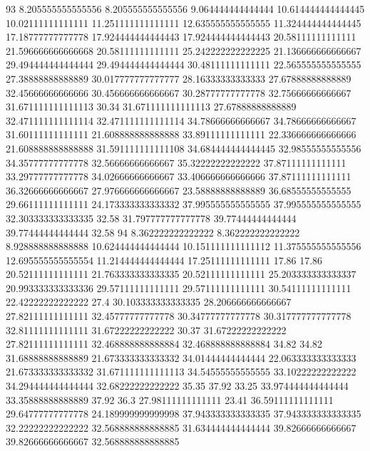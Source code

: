 93 8.205555555555556 8.205555555555556 9.064444444444444 10.614444444444445 10.02111111111111 11.251111111111111 12.635555555555555 11.324444444444445 17.18777777777778 17.924444444444443 17.924444444444443 20.58111111111111 21.596666666666668 20.58111111111111 25.242222222222225 21.136666666666667 29.494444444444444 29.494444444444444 30.48111111111111 22.565555555555555 27.38888888888889 30.017777777777777 28.16333333333333 27.67888888888889 32.45666666666666 30.456666666666667 30.28777777777778 32.75666666666667 31.671111111111113 30.34 31.671111111111113 27.67888888888889 32.471111111111114 32.471111111111114 34.78666666666667 34.78666666666667 31.60111111111111 21.608888888888888 33.89111111111111 22.336666666666666 21.608888888888888 31.591111111111108 34.684444444444445 32.98555555555556 34.35777777777778 32.56666666666667 35.32222222222222 37.87111111111111 33.29777777777778 34.02666666666667 33.406666666666666 37.87111111111111 36.32666666666667 27.976666666666667 23.58888888888889 36.68555555555555 29.66111111111111 24.173333333333332 37.995555555555555 37.995555555555555 32.303333333333335 32.58 31.797777777777778 39.77444444444444 39.77444444444444 32.58
94 8.362222222222222 8.362222222222222 8.928888888888888 10.624444444444444 10.151111111111112 11.375555555555556 12.695555555555554 11.214444444444444 17.25111111111111 17.86 17.86 20.52111111111111 21.763333333333335 20.52111111111111 25.203333333333337 20.993333333333336 29.57111111111111 29.57111111111111 30.54111111111111 22.42222222222222 27.4 30.103333333333335 28.206666666666667 27.82111111111111 32.45777777777778 30.34777777777778 30.317777777777778 32.81111111111111 31.67222222222222 30.37 31.67222222222222 27.82111111111111 32.468888888888884 32.468888888888884 34.82 34.82 31.68888888888889 21.673333333333332 34.01444444444444 22.063333333333333 21.673333333333332 31.671111111111113 34.54555555555555 33.10222222222222 34.294444444444444 32.68222222222222 35.35 37.92 33.25 33.974444444444444 33.35888888888889 37.92 36.3 27.98111111111111 23.41 36.59111111111111 29.64777777777778 24.189999999999998 37.943333333333335 37.943333333333335 32.22222222222222 32.568888888888885 31.634444444444444 39.82666666666667 39.82666666666667 32.568888888888885
